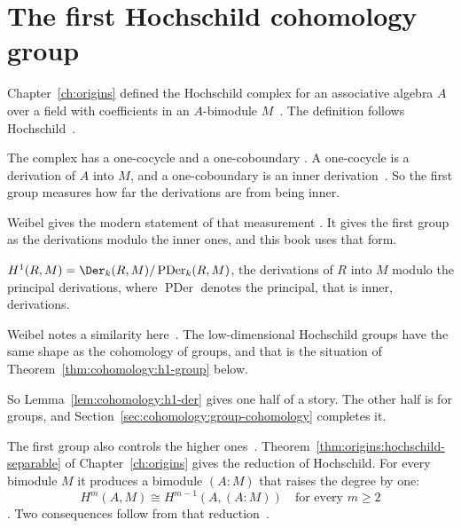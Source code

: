 \section{The first Hochschild cohomology group}\label{sec:cohomology:first-cohomology}

Chapter~\ref{ch:origins} defined the Hochschild complex for an associative
algebra $A$ over a field with coefficients in an
$A$-bimodule $M$~\cite[p.~60]{Hochschild1945}. The definition follows
Hochschild~\cite[p.~60]{Hochschild1945}.

The complex has a one-cocycle and a one-coboundary
\cite[p.~60]{Hochschild1945}. A one-cocycle is a derivation of $A$ into $M$,
and a one-coboundary is an inner
derivation~\cite[p.~60]{Hochschild1945}. So the first group measures how far
the derivations are from being inner.

Weibel gives the modern statement of that measurement
\cite[p.~301]{Weibel1994}. It gives the first group as the derivations modulo
the inner ones, and this book uses that form.

\begin{lemma}\label{lem:cohomology:h1-der}
$H^1(R, M) = \Der_k(R, M)/\operatorname{PDer}_k(R, M)$, the derivations of $R$ into
$M$ modulo the principal derivations, where $\operatorname{PDer}$ denotes the
principal, that is inner, derivations.
\end{lemma}

Weibel notes a similarity here~\cite[p.~301]{Weibel1994}. The low-dimensional
Hochschild groups have the same shape as the cohomology of groups, and that is
the situation of Theorem~\ref{thm:cohomology:h1-group} below.

So Lemma~\ref{lem:cohomology:h1-der} gives one half of a story. The other half
is for groups, and Section~\ref{sec:cohomology:group-cohomology} completes it.

The first group also controls the higher
ones~\cite[Theorem~3.1, p.~60]{Hochschild1945}.
Theorem~\ref{thm:origins:hochschild-separable} of Chapter~\ref{ch:origins} gives
the reduction of Hochschild. For every bimodule $M$ it produces a bimodule
$(A:M)$ that raises the degree by one:
\[
  H^m(A,M) \cong H^{m-1}(A,(A:M)) \quad \text{for every } m \ge 2
\]
\cite[Theorem~3.1, p.~60]{Hochschild1945}. Two consequences follow from that
reduction~\cite[Theorem~3.1, p.~60]{Hochschild1945}.

